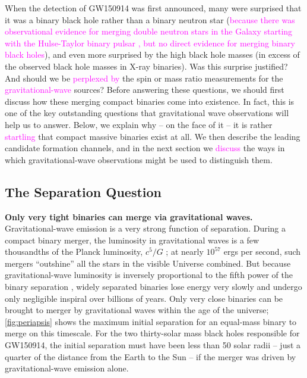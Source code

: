 \documentclass[iop,onecolumn]{revtex4}
\newcommand{\ilya}[1]{\textcolor{magenta}{#1}}
\begin{document}
When the detection of GW150914 was first announced, many were surprised that it was a binary black hole rather than a binary neutron star (\ilya{because there was observational evidence for merging double neutron stars in the Galaxy starting with the Hulse-Taylor binary pulsar \citep{HulseTaylor:1975}, but no direct evidence for merging binary black holes}), and even more surprised by the high black hole masses (in excess of the observed black hole masses in X-ray binaries). Was this surprise justified? And should we be \ilya{perplexed by} the spin or mass ratio measurements for the \ilya{gravitational-wave} sources? Before answering these questions, we should first discuss how these merging compact binaries come into existence. In fact, this is one of the key outstanding questions that gravitational wave observations will help us to answer. Below, we explain why -- on the face of it -- it is rather \ilya{startling} that compact massive binaries exist at all. We then describe the leading candidate formation channels, and in the next section we \ilya{discuss} the ways in which gravitational-wave observations might be used to distinguish them.


\subsection{The Separation Question}


\textbf{Only very tight binaries can merge via gravitational waves.} Gravitational-wave emission is a very strong function of separation. During a compact binary merger, the luminosity in gravitational waves is a few thousandths of the Planck luminosity, $c^5/G$ \citep[e.g.,][]{Cardoso:2018}; at nearly $10^{57}$ ergs per second, such mergers ``outshine'' all the stars in the visible Universe combined. But because gravitational-wave luminosity is inversely proportional to the fifth power of the binary separation \citep{Peters:1964}, widely separated binaries lose energy very slowly and undergo only negligible inspiral over billions of years. Only very close binaries can be brought to merger by gravitational waves within the age of the universe; \autoref{fig:periapsis} shows the maximum initial separation for an equal-mass binary to merge on this timescale. For the two thirty-solar mass black holes responsible for GW150914, the initial separation must have been less than 50 solar radii -- just a quarter of the distance from the Earth to the Sun -- if the merger was driven by gravitational-wave emission alone.
\end{document}

